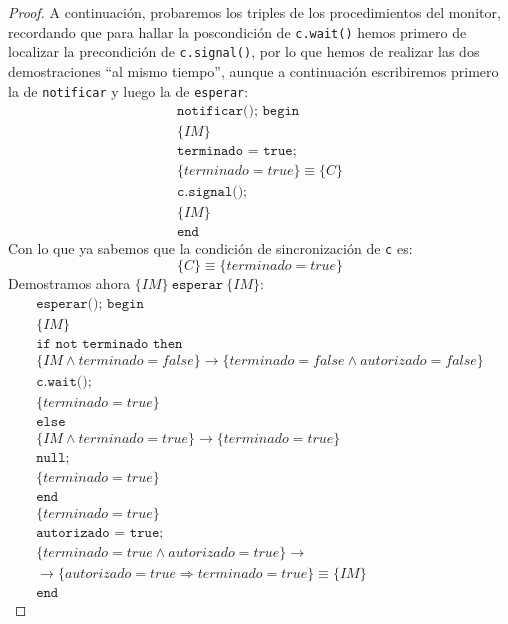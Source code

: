 \begin{proof}
    A continuación, probaremos los triples de los procedimientos del monitor, recordando que para hallar la poscondición de \verb|c.wait()| hemos primero de localizar la precondición de \verb|c.signal()|, por lo que hemos de realizar las dos demostraciones ``al mismo tiempo'', aunque a continuación escribiremos primero la de \verb|notificar| y luego la de \verb|esperar|:
    \begin{gather*}
        \texttt{notificar(); begin} \\
        \{IM\} \\
        \texttt{terminado = true;} \\
        \{terminado = true\} \equiv \{C\} \\
        \texttt{c.signal();} \\
        \{IM\} \\
        \texttt{end}
    \end{gather*}
    Con lo que ya sabemos que la condición de sincronización de \verb|c| es: 
    \begin{equation*}
        \{C\}\equiv \{terminado = true\}
    \end{equation*}
    Demostramos ahora $\{IM\}\ \texttt{esperar}\ \{IM\}$:
    \begin{gather*}
        \texttt{esperar(); begin} \\
        \{IM\} \\
        \texttt{if not terminado then} \\
        \{IM \land terminado = false\} \rightarrow \{terminado = false \land autorizado = false\} \\
        \texttt{c.wait();} \\
        \{terminado = true\} \\
        \texttt{else} \\
        \{IM \land terminado = true\} \rightarrow \{terminado = true\} \\
        \texttt{null;} \\
        \{terminado = true\} \\
        \texttt{end} \\
        \{terminado = true\} \\
        \texttt{autorizado = true;} \\
        \{terminado = true \land autorizado = true\} \rightarrow \\ 
        \rightarrow \{autorizado = true \Longrightarrow terminado = true\} \equiv \{IM\}  \\
        \texttt{end}
    \end{gather*}
\end{proof}

